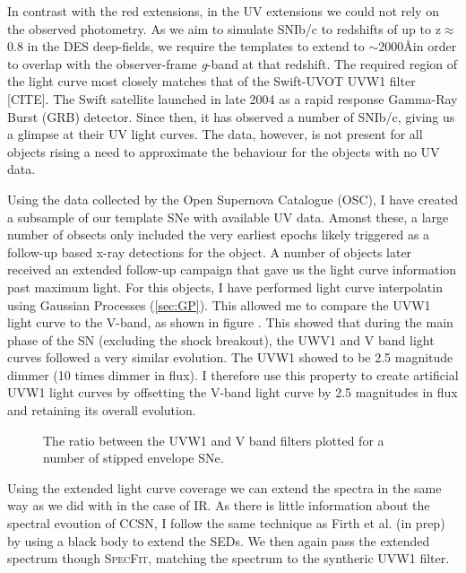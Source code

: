 In contrast with the red extensions, in the UV extensions we could not rely on the observed photometry. As we aim to simulate SNIb/c to redshifts of up to z$\approx$0.8 in the DES deep-fields, we require the templates to extend to $\sim$2000\AA in order to overlap with the observer-frame \textit{g}-band at that redshift. The required region of the light curve most closely matches that of the Swift-UVOT UVW1 filter [CITE]. The Swift satellite launched in late 2004 as a rapid response Gamma-Ray Burst (GRB) detector. Since then, it has observed a number of SNIb/c, giving us a glimpse at their UV light curves. The data, however, is not present for all objects rising a need to approximate the behaviour for the objects with no UV data.

Using the data collected by the Open Supernova Catalogue (OSC), I have created a subsample of our template SNe with available UV data. Amonst these, a large number of obsects only included the very earliest epochs likely triggered as a follow-up based x-ray detections for the object. A number of objects later received an extended follow-up campaign that gave us the light curve information past maximum light. For this objects, I have performed light curve interpolatin using Gaussian Processes (\cref{sec:GP}). This allowed me to compare the UVW1 light curve to the V-band, as shown in figure . This showed that during the main phase of the SN (excluding the shock breakout), the UWV1 and V band light curves followed a very similar evolution. The UVW1 showed to be 2.5 magnitude dimmer (10 times dimmer in flux). I therefore use this property to create artificial UVW1 light curves by offsetting the V-band light curve by 2.5 magnitudes in flux and retaining its overall evolution.

\begin{figure}
  \caption{The ratio between the UVW1 and V band filters plotted for a number of stipped envelope SNe.}
  \label{fig:VvsUVW1}
\end{figure}

Using the extended light curve coverage we can extend the spectra in the same way as we did with in the case of IR. As there is little information about the spectral evoution of CCSN, I follow the same technique as Firth et al. (in prep) by using a black body to extend the SEDs. We then again pass the extended spectrum though \textsc{SpecFit}, matching the spectrum to the syntheric UVW1 filter.

